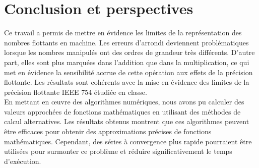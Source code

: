 \documentclass{article}
\begin{document}
\section{Conclusion et perspectives}
Ce travail a permis de mettre en évidence les limites de la représentation des nombres flottants en machine. Les erreurs d’arrondi deviennent problématiques lorsque les nombres manipulés ont des ordres de grandeur très différents. D'autre part, elles sont plus marquées dans l'addition que dans la multiplication, ce qui met en évidence la sensibilité accrue de cette opération aux effets de la précision flottante. Les résultats sont cohérents avec la mise en évidence des limites de la précision flottante IEEE 754 étudiée en classe.\\
En mettant en œuvre des algorithmes numériques, nous avons pu calculer des valeurs approchées de fonctions mathématiques en utilisant des méthodes de calcul alternatives. Les résultats obtenus montrent que ces algorithmes peuvent être efficaces pour obtenir des approximations précises de fonctions mathématiques. Cependant, des séries à convergence plus rapide pourraient être utilisées pour surmonter ce problème et réduire significativement le temps d'exécution.



\end{document}

